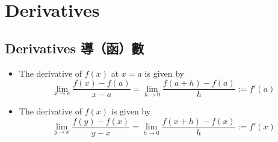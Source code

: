 %
%

\def\lin{{\text{LIN}}}
\def\prod{{\text{PR}}}
\def\quot{{\text{QR}}}
\def\simp{{\text{SMP}}}

\graphicspath{{figures/differentiation/}}
\chapter{Derivatives}\label{chap deriv}
\section{Derivatives 導（函）數}
\begin{defn}
\begin{itemize}
\item The derivative of $f(x)$ at $x = a$ is given by 
$$\displaystyle \lim_{x \to a} \frac{f(x) - f(a)}{x -a} = \lim_{h \to 0} \frac{f(a + h) -f(a)}{h} := f'(a)$$
\item The derivative of $f(x)$ is given by 
$$\displaystyle \lim_{y \to x} \frac{f(y) - f(x)}{y - x} = \lim_{h \to 0} \frac{f(x + h) - f(x)}{h} := f'(x)$$
\end{itemize}
\end{defn}

